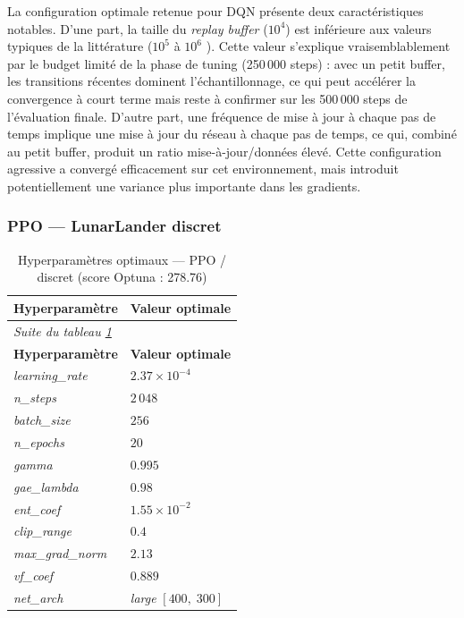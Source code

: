 La configuration optimale retenue pour DQN présente deux caractéristiques
notables. D'une part, la taille du \textit{replay buffer} ($10^4$) est
inférieure aux valeurs typiques de la littérature ($10^5$ à $10^6$
\parencite{mnihHumanlevelControlDeep2015}). Cette valeur s'explique
vraisemblablement par le budget limité de la phase de tuning (250\,000 steps)
: avec un petit buffer, les transitions récentes dominent l'échantillonnage,
ce qui peut accélérer la convergence à court terme mais reste à confirmer sur
les 500\,000 steps de l'évaluation finale. D'autre part, une fréquence de mise à jour à chaque pas de temps implique une mise à jour du réseau à chaque pas de temps, ce qui, combiné au petit buffer, produit un ratio mise-à-jour/données élevé. Cette configuration agressive a convergé efficacement sur cet environnement, mais introduit potentiellement une variance plus importante dans les gradients.
 
\newpage
\subsubsection{PPO --- LunarLander discret}
 
\begingroup
\footnotesize
\setlength{\tabcolsep}{8pt}
\renewcommand{\arraystretch}{1.4}
\begin{longtable}{%
  p{\hpOptA}%
  p{\dimexpr\textwidth - \hpOptA - 4\tabcolsep\relax}%
}
  \caption{Hyperparamètres optimaux --- PPO / discret (score Optuna : 278.76)}
  \label{tab:hparams_opt_ppo_disc}\\
  \toprule
  \textbf{Hyperparamètre} & \textbf{Valeur optimale} \\
  \midrule
\endfirsthead
  \multicolumn{2}{l}{\footnotesize\itshape Suite du tableau \ref{tab:hparams_opt_ppo_disc}}\\[2pt]
  \toprule
  \textbf{Hyperparamètre} & \textbf{Valeur optimale} \\
  \midrule
\endhead
  \bottomrule
\endlastfoot
 
\textit{learning\_rate} & $2.37 \times 10^{-4}$ \\
\textit{n\_steps}       & $2\,048$ \\
\textit{batch\_size}    & $256$ \\
\textit{n\_epochs}      & $20$ \\
\textit{gamma}          & $0.995$ \\
\textit{gae\_lambda}    & $0.98$ \\
\textit{ent\_coef}      & $1.55 \times 10^{-2}$ \\
\textit{clip\_range}    & $0.4$ \\
\textit{max\_grad\_norm}& $2.13$ \\
\textit{vf\_coef}       & $0.889$ \\
\textit{net\_arch}      & \textit{large} $[400,\;300]$ \\
\end{longtable}
\endgroup
 
